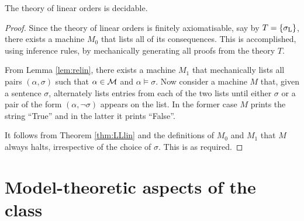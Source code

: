 \begin{thm}
	The theory of linear orders is decidable.
\end{thm}
\begin{proof}
	Since the theory of linear orders is finitely axiomatisable, say by $T=\left\lbrace \sigma_{\mathrm{L}}\right\rbrace$, there exists a machine $M_0$ that lists all of its consequences.  This is accomplished, using inference rules, by mechanically generating all proofs from the theory $T$.

	From Lemma \ref{lem:relin}, there exists a machine $M_1$ that mechanically lists all pairs $(\alpha,\sigma)$ such that $\alpha\in\mathcal{M}$ and $\alpha\models\sigma$.  Now consider a machine $M$ that, given a sentence $\sigma$, alternately lists entries from each of the two lists until either $\sigma$ or a pair of the form $(\alpha,\neg\sigma)$ appears on the list.  In the former case $M$ prints the string ``True'' and in the latter it prints ``False''.

	It follows from Theorem \ref{thm:LLlin} and the definitions of $M_0$ and $M_1$ that $M$ always halts, irrespective of the choice of $\sigma$.  This is as required.
\end{proof}


\section{Model-theoretic aspects of the class \text{$\dense$}}


